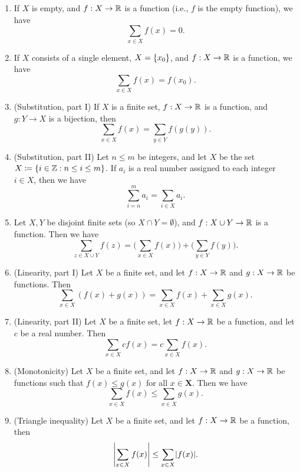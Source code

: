 \begin{prop}\label{i:7.1.11}
  \begin{enumerate}
    \item\label{i:7.1.11.a} If \(X\) is empty, and \(f : X \to \mathbb{R}\) is a function (i.e., \(f\) is the empty function), we have
    \[
      \sum_{x \in X} f(x) = 0.
    \]
    \item\label{i:7.1.11.b} If \(X\) consists of a single element, \(X = \left\lbrace x_0\right\rbrace\), and \(f : X \to \mathbb{R}\) is a function, we have
    \[
      \sum_{x \in X} f(x) = f(x_0).
    \]
    \item\label{i:7.1.11.c} (Substitution, part I) If \(X\) is a finite set, \(f : X \to \mathbb{R}\) is a function, and \(g : Y \to X\) is a bijection, then
    \[
      \sum_{x \in X} f(x) = \sum_{y \in Y} f(g(y)).
    \]
    \item\label{i:7.1.11.d} (Substitution, part II) Let \(n \leq m\) be integers, and let \(X\) be the set \(X \coloneqq \left\lbrace i \in \mathbb{Z} : n \leq i \leq m\right\rbrace\).
    If \(a_i\) is a real number assigned to each integer \(i \in X\), then we have
    \[
      \sum_{i = n}^m a_i = \sum_{i \in X} a_i.
    \]
    \item\label{i:7.1.11.e} Let \(X, Y\) be disjoint finite sets (so \(X \cap Y = \emptyset\)), and \(f : X \cup Y \to \mathbb{R}\) is a function.
    Then we have
    \[
      \sum_{z \in X \cup Y} f(z) = \Bigg(\sum_{x \in X} f(x)\Bigg) + \Bigg(\sum_{y \in Y} f(y)\Bigg).
    \]
    \item\label{i:7.1.11.f} (Linearity, part I) Let \(X\) be a finite set, and let \(f : X \to \mathbb{R}\) and \(g : X \to \mathbb{R}\) be functions.
    Then
    \[
      \sum_{x \in X} (f(x) + g(x)) = \sum_{x \in X} f(x) + \sum_{x \in X} g(x).
    \]
    \item\label{i:7.1.11.g} (Linearity, part II) Let \(X\) be a finite set, let \(f : X \to \mathbb{R}\) be a function, and let \(c\) be a real number.
    Then
    \[
      \sum_{x \in X} cf(x) = c \sum_{x \in X} f(x).
    \]
    \item\label{i:7.1.11.h} (Monotonicity) Let \(X\) be a finite set, and let \(f : X \to \mathbb{R}\) and \(g : X \to \mathbb{R}\) be functions such that \(f(x) \leq g(x)\) for all \(x \in \mathbf{X}\).
    Then we have
    \[
      \sum_{x \in X} f(x) \leq \sum_{x \in X} g(x).
    \]
    \item\label{i:7.1.11.i} (Triangle inequality) Let \(X\) be a finite set, and let \(f : X \to \mathbb{R}\) be a function, then
    \[
      \abs{\sum_{x \in X} f(x)} \leq \sum_{x \in X} \abs{f(x)}.
    \]
  \end{enumerate}
\end{prop}


